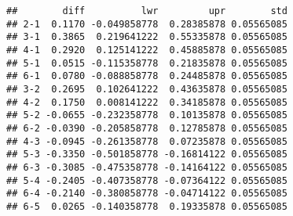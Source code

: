 \documentclass[
]{article}
\newenvironment{Shaded}{\begin{snugshade}}{\end{snugshade}}
\newcommand{\DecValTok}[1]{\textcolor[rgb]{0.00,0.00,0.81}{#1}}
\newcommand{\FloatTok}[1]{\textcolor[rgb]{0.00,0.00,0.81}{#1}}
\newcommand{\FunctionTok}[1]{\textcolor[rgb]{0.00,0.00,0.00}{#1}}
\newcommand{\NormalTok}[1]{#1}
\newcommand{\OtherTok}[1]{\textcolor[rgb]{0.56,0.35,0.01}{#1}}
\newcommand{\SpecialCharTok}[1]{\textcolor[rgb]{0.00,0.00,0.00}{#1}}
\begin{document}
\begin{Shaded}
\end{Shaded}

\begin{verbatim}
##        diff          lwr         upr        std
## 2-1  0.1170 -0.049858778  0.28385878 0.05565085
## 3-1  0.3865  0.219641222  0.55335878 0.05565085
## 4-1  0.2920  0.125141222  0.45885878 0.05565085
## 5-1  0.0515 -0.115358778  0.21835878 0.05565085
## 6-1  0.0780 -0.088858778  0.24485878 0.05565085
## 3-2  0.2695  0.102641222  0.43635878 0.05565085
## 4-2  0.1750  0.008141222  0.34185878 0.05565085
## 5-2 -0.0655 -0.232358778  0.10135878 0.05565085
## 6-2 -0.0390 -0.205858778  0.12785878 0.05565085
## 4-3 -0.0945 -0.261358778  0.07235878 0.05565085
## 5-3 -0.3350 -0.501858778 -0.16814122 0.05565085
## 6-3 -0.3085 -0.475358778 -0.14164122 0.05565085
## 5-4 -0.2405 -0.407358778 -0.07364122 0.05565085
## 6-4 -0.2140 -0.380858778 -0.04714122 0.05565085
## 6-5  0.0265 -0.140358778  0.19335878 0.05565085
\end{verbatim}
\end{document}

